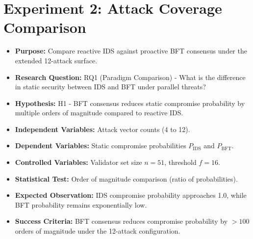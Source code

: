 \documentclass[12pt, oneside, a4paper]{report}
\theoremstyle{definition}
\theoremstyle{remark}
\begin{document}
\section{Experiment 2: Attack Coverage Comparison}
\label{sec:ed:e2}
\begin{itemize}
  \item \textbf{Purpose:} Compare reactive IDS against proactive BFT consensus under the extended 12-attack surface.
  \item \textbf{Research Question:} RQ1 (Paradigm Comparison) - What is the difference in static security between IDS and BFT under parallel threats?
  \item \textbf{Hypothesis:} H1 - BFT consensus reduces static compromise probability by multiple orders of magnitude compared to reactive IDS.
  \item \textbf{Independent Variables:} Attack vector counts (4 to 12).
  \item \textbf{Dependent Variables:} Static compromise probabilities $P_{\mathrm{IDS}}$ and $P_{\mathrm{BFT}}$.
  \item \textbf{Controlled Variables:} Validator set size $n = 51$, threshold $f = 16$.
  \item \textbf{Statistical Test:} Order of magnitude comparison (ratio of probabilities).
  \item \textbf{Expected Observation:} IDS compromise probability approaches 1.0, while BFT probability remains exponentially low.
  \item \textbf{Success Criteria:} BFT consensus reduces compromise probability by $> 100$ orders of magnitude under the 12-attack configuration.
\end{itemize}
\end{document}
